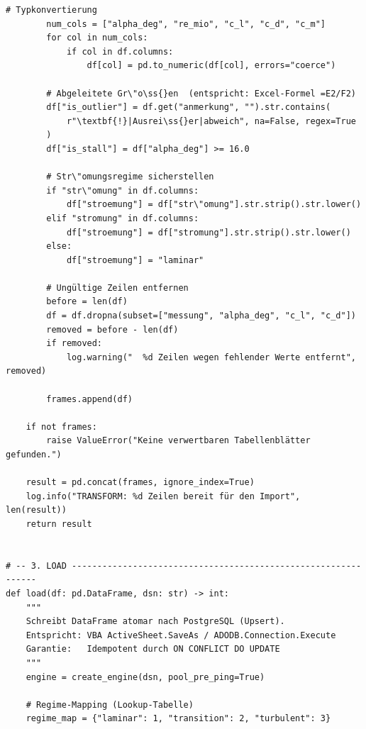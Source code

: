 ﻿\documentclass[12pt,a4paper]{report}
\theoremstyle{definition}
\theoremstyle{remark}
\begin{document}
\begin{lstlisting}[style=python, caption={migrate.py: Vollständige ETL-Pipeline}, label=lst:etl]
        # Typkonvertierung
        num_cols = ["alpha_deg", "re_mio", "c_l", "c_d", "c_m"]
        for col in num_cols:
            if col in df.columns:
                df[col] = pd.to_numeric(df[col], errors="coerce")

        # Abgeleitete Gr\"o\ss{}en  (entspricht: Excel-Formel =E2/F2)
        df["is_outlier"] = df.get("anmerkung", "").str.contains(
            r"\textbf{!}|Ausrei\ss{}er|abweich", na=False, regex=True
        )
        df["is_stall"] = df["alpha_deg"] >= 16.0

        # Str\"omungsregime sicherstellen
        if "str\"omung" in df.columns:
            df["stroemung"] = df["str\"omung"].str.strip().str.lower()
        elif "stromung" in df.columns:
            df["stroemung"] = df["stromung"].str.strip().str.lower()
        else:
            df["stroemung"] = "laminar"

        # Ungültige Zeilen entfernen
        before = len(df)
        df = df.dropna(subset=["messung", "alpha_deg", "c_l", "c_d"])
        removed = before - len(df)
        if removed:
            log.warning("  %d Zeilen wegen fehlender Werte entfernt", removed)

        frames.append(df)

    if not frames:
        raise ValueError("Keine verwertbaren Tabellenblätter gefunden.")

    result = pd.concat(frames, ignore_index=True)
    log.info("TRANSFORM: %d Zeilen bereit für den Import", len(result))
    return result


# -- 3. LOAD ---------------------------------------------------------------
def load(df: pd.DataFrame, dsn: str) -> int:
    """
    Schreibt DataFrame atomar nach PostgreSQL (Upsert).
    Entspricht: VBA ActiveSheet.SaveAs / ADODB.Connection.Execute
    Garantie:   Idempotent durch ON CONFLICT DO UPDATE
    """
    engine = create_engine(dsn, pool_pre_ping=True)

    # Regime-Mapping (Lookup-Tabelle)
    regime_map = {"laminar": 1, "transition": 2, "turbulent": 3}


\end{lstlisting}
\end{document}
